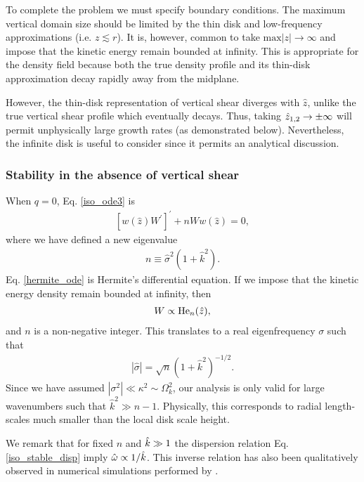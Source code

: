 To complete the problem we must specify boundary conditions. The 
maximum vertical domain size should be limited by the thin
disk and low-frequency approximations (i.e. $z\lesssim r$).     
It is, however, common to take $\mathrm{max}|z|\to\infty$ and impose
that the kinetic  energy remain bounded at infinity. This 
is appropriate for the density field because both the true density profile 
and its thin-disk approximation decay rapidly away from the midplane.   

However, the thin-disk representation of vertical shear diverges with 
$\hat{z}$, unlike the true vertical shear profile which eventually
decays.  Thus, taking $\hat{z}_{1,2}\to \pm\infty$ will permit unphysically large growth
rates (as demonstrated below). Nevertheless, the infinite disk is
useful to consider since it permits an analytical discussion. 

\subsubsection{Stability in the absence of vertical shear}\label{iso_stable}
When $q=0$, Eq. \ref{iso_ode3} is
\begin{align}\label{hermite_ode}
  \left[w(\hat{z})W^\prime \right]^\prime + nW
  w(\hat{z}) =0, 
\end{align}
where we have defined a new eigenvalue
\begin{align}
  n \equiv \hat{\sigma}^2(1+\hat{k}^2). 
\end{align} 
Eq. \ref{hermite_ode} is Hermite's differential equation. If we impose
that the kinetic energy density remain bounded at infinity, then  
\begin{align}
  W \propto \operatorname{He}_n(\hat{z}),
\end{align}
and $n$ is a non-negative integer. This translates to a real
eigenfrequency $\sigma$ such that
\begin{align}
  \left|\hat{\sigma}\right| = \sqrt{n}
  \left(1+\hat{k}^2\right)^{-1/2}. \label{iso_stable_disp}
\end{align}
Since we have assumed $|\sigma^2|\ll \kappa^2\sim \Omega_k^2$, our
analysis is only valid for large wavenumbers such that $\hat{k}^2\gg   
n-1$. Physically, this corresponds to radial length-scales much
smaller than the local disk scale height. 

We remark that for fixed $n$ and $\hat{k}\gg 1$ the dispersion relation 
Eq. \ref{iso_stable_disp} imply $\hat{\omega}\propto 1/\hat{k}$. This inverse relation 
has also been qualitatively observed in numerical simulations performed by 
\cite{stoll14}. 


